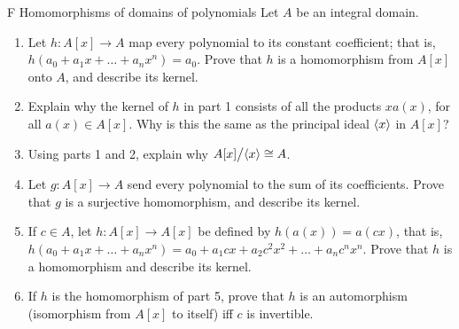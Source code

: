 \begin{exercise}{F Homomorphisms of domains of polynomials}
Let $A$ be an integral domain.
\begin{enumerate}
    \item Let $h:A[x]\rightarrow A$ map every polynomial to its constant coefficient; that is, $h(a_0+a_1x+\dots+a_nx^n)=a_0$. Prove that $h$ is a homomorphism from $A[x]$ onto $A$, and describe its kernel.
    \item Explain why the kernel of $h$ in part 1 consists of all the products $xa(x)$, for all $a(x)\in A[x]$. Why is this the same as the principal ideal $\langle x\rangle$ in $A[x]$?
    \item Using parts 1 and 2, explain why ${\textstyle A[x]}\big/{\textstyle \langle x\rangle}\cong A$.
    \item Let $g:A[x]\rightarrow A$ send every polynomial to the sum of its coefficients. Prove that $g$ is a surjective homomorphism, and describe its kernel.
    \item If $c\in A$, let $h:A[x]\rightarrow A[x]$ be defined by $h(a(x))=a(cx)$, that is, $h(a_0+a_1x+\dots+a_nx^n)=a_0+a_1cx+a_2c^2x^2+\dots+a_nc^nx^n$. Prove that $h$ is a homomorphism and describe its kernel.
    \item If $h$ is the homomorphism of part 5, prove that $h$ is an automorphism (isomorphism from $A[x]$ to itself) iff $c$ is invertible.
\end{enumerate}
\end{exercise}
